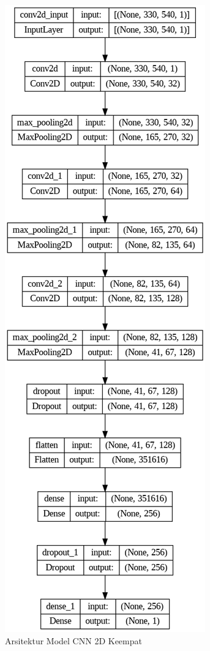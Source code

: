   \begin{figure} [H] \centering
    \includegraphics[scale=0.4]{gambar/bab3/cnnarc4.png}
    \caption{Arsitektur Model CNN 2D Keempat}
    \label{fig:cnnarc4}
  \end{figure}

